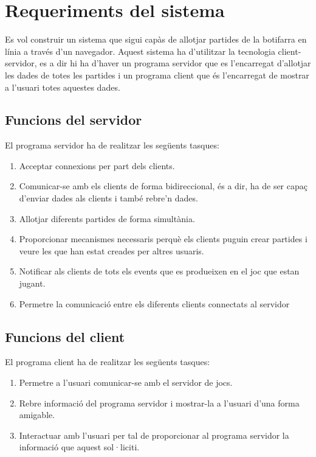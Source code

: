 

\chapter{Requeriments del sistema}

Es vol construir un sistema que sigui capàs de allotjar partides de la botifarra en línia a través d'un navegador. 
Aquest sistema ha d'utilitzar la tecnologia client-servidor, es a dir hi ha d'haver un programa servidor que es l'encarregat d'allotjar les dades de totes les partides i un programa client que és l'encarregat de mostrar a l'usuari totes aquestes dades. 
 

\section{Funcions del servidor}

El programa servidor ha de realitzar les següents tasques:

\begin{enumerate}
	\item{Acceptar connexions per part dels clients.}
	\item{Comunicar-se amb els clients de forma bidireccional, és a dir, ha de ser capaç d'enviar dades als clients  i també rebre'n dades.}
	\item{Allotjar diferents partides de forma simultània.}
	\item{Proporcionar mecanismes necessaris perquè els clients puguin crear partides i veure les que han estat creades per altres usuaris.}
	\item{Notificar als clients de tots els events que es produeixen en el joc que estan jugant.}
	\item{Permetre la comunicació entre els diferents clients connectats al servidor}	
\end{enumerate}

\section{Funcions del client}

El programa client ha de realitzar les següents tasques: 

\begin{enumerate}
	\item{Permetre a l'usuari comunicar-se amb el servidor de jocs.}
	\item{Rebre informació del programa servidor i mostrar-la a l'usuari d'una forma amigable.}
	\item{Interactuar amb l'usuari per tal de proporcionar al programa servidor la informació que aquest sol·liciti.}	
\end{enumerate}


